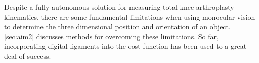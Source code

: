 Despite a fully autonomous solution for measuring total knee arthroplasty kinematics, there are some fundamental limitations when using monocular vision to determine the three dimensional position and orientation of an object. \cref{sec:aim2} discusses methods for overcoming these limitations. So far, incorporating digital ligaments into the cost function has been used to a great deal of success.
